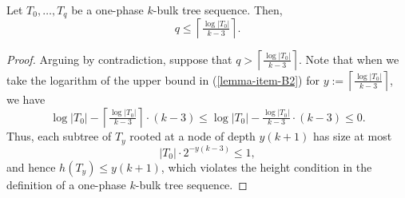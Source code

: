 \documentclass[kpfonts]{patmorin}
\let\leq\leqslant
\newcommand{\itemref}[1]{(\ref{#1})}
\begin{document}
\begin{cor}
Let $T_0,\dots,T_{q}$ be a one-phase $k$-bulk tree sequence.
Then,
\[
q \leq \left\lceil\tfrac{\log|T_0|}{k-3}\right\rceil.
\]
\end{cor}
\begin{proof}
Arguing by contradiction, suppose that $q > \left\lceil\tfrac{\log|T_0|}{k-3}\right\rceil$.
Note that when we take the logarithm of the upper bound in \itemref{lemma-item-B2} for $y:=\left\lceil\tfrac{\log|T_0|}{k-3}\right\rceil$,  we have
\[
\log|T_0| - \left\lceil\tfrac{\log|T_0|}{k-3}\right\rceil\cdot(k-3)
\leq \log|T_0|-\tfrac{\log|T_0|}{k-3}\cdot(k-3)
\leq0.
\]
Thus, each subtree of $T_{y}$ rooted at a node of depth $y(k+1)$ has size at most
\[
|T_0|\cdot2^{-y(k-3)} \leq 1,
\]
and hence $h(T_y) \leq y(k+1)$, which violates the height condition in the definition of a one-phase $k$-bulk tree sequence. 
\end{proof}
\end{document}
